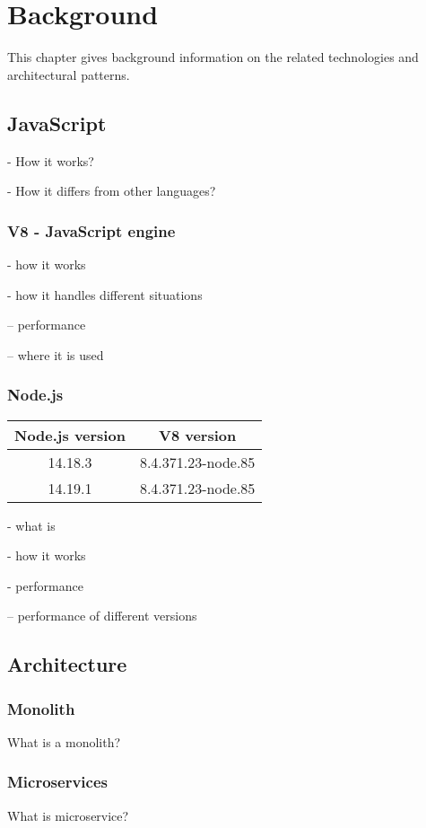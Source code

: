 \chapter{Background\label{background}}
This chapter gives background information on the related technologies and architectural patterns.


\section{JavaScript}
- How it works?

- How it differs from other languages?


\subsection{V8 - JavaScript engine}
- how it works

- how it handles different situations

-- performance

-- where it is used





\subsection{Node.js}

\begin{center}
\begin{tabular}{|c c|} 
 \hline
 Node.js version & V8 version \\ [0.5ex] 
 \hline
 14.18.3 & 8.4.371.23-node.85  \\ 
 \hline
  14.19.1 & 8.4.371.23-node.85  \\ 
 \hline
\end{tabular}
\end{center}

- what is

- how it works

- performance

-- performance of different versions











\section{Architecture}

\subsection{Monolith}
What is a monolith?

\subsection{Microservices}
What is microservice?
